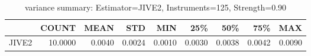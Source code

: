 \begin{table}[ht]
\centering
\caption{variance summary: Estimator=JIVE2, Instruments=125, Strength=0.90}
\begin{tabular}{lrrrrrrrr}
\toprule
 & COUNT & MEAN & STD & MIN & 25\% & 50\% & 75\% & MAX \\
\midrule
JIVE2 & 10.0000 & 0.0040 & 0.0024 & 0.0010 & 0.0030 & 0.0038 & 0.0042 & 0.0090 \\
\bottomrule
\end{tabular}
\end{table}
